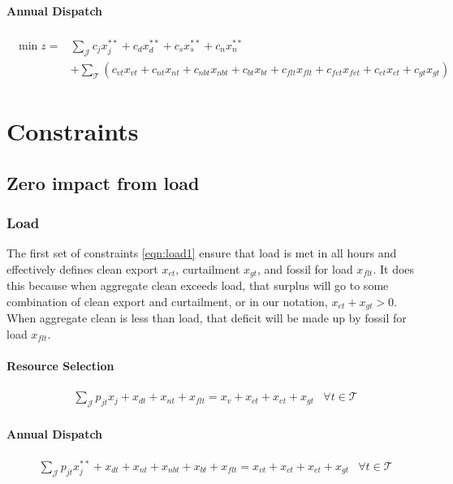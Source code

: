 \documentclass[9pt, oneside]{article}
\numberwithin{equation}{subsubsection}
\begin{document}
\paragraph{Annual Dispatch}
\begin{align}
	\begin{split}
		\min z = & \sum_{\mathcal{J}} c_{j} x_j^{**} + c_{d}x_{d}^{**} + c_{s}x_{s}^{**} + c_{n}x_{n}^{**}                                                                                               \\
		         & + \sum_{\mathcal{T}} \left( c_{vt} x_{vt} +c_{nt} x_{nt} + c_{nbt} x_{nbt} + c_{bt} x_{bt} + c_{flt} x_{flt}+ c_{fet} x_{fet} + c_{et} x_{et} + c_{gt} x_{gt} \right) \label{eqn:obj}
	\end{split}
\end{align}

\section{Constraints}\label{sec:constraints}
\subsection{Zero impact from load}\label{subsec:zero-impact-from-load}
\subsubsection{Load}
The first set of constraints \ref{eqn:load1} ensure that load is met in all hours and effectively defines clean export $x_{et}$, curtailment $x_{gt}$, and fossil for load $x_{flt}$.
It does this because when aggregate clean exceeds load, that surplus will go to some combination of clean export and curtailment, or in our notation, $x_{et}+x_{gt} > 0$.
When aggregate clean is less than load, that deficit will be made up by fossil for load $x_{flt}$.

\paragraph{Resource Selection}
\begin{subequations}
	\begin{align}
		 & \sum_{ \mathcal{J}} p_{jt}x_{j} + x_{dt} + x_{nt} + x_{flt} = x_v + x_{ct} + x_{et} + x_{gt} & \forall t \in \mathcal{T} \label{eqn:load1}
	\end{align}
\end{subequations}

\paragraph{Annual Dispatch}
\begin{subequations}
	\begin{align}
		 & \sum_{ \mathcal{J}} p_{jt} x_j^{**} + x_{dt} + x_{nt} + x_{nbt}+ x_{bt} + x_{flt} = x_{vt} + x_{ct} + x_{et} + x_{gt} & \forall t \in \mathcal{T} \label{eqn:load2}
	\end{align}
\end{subequations}
\end{document}
